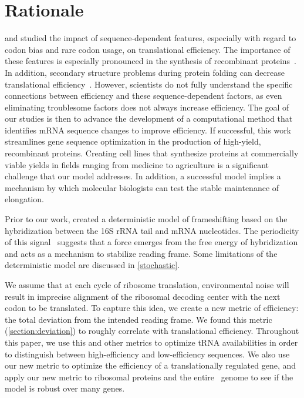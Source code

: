 \documentclass[12pt]{article}
\begin{document}
\section{Rationale}
\citet{kozak05} and \citet{kane95} studied the impact
of sequence-dependent features, especially with regard to codon bias 
and rare codon usage, on translational efficiency.  The importance of 
these features is especially pronounced in the synthesis of recombinant 
proteins~\cite{sorensen05}.  In addition, secondary structure problems 
during protein folding can decrease translational 
efficiency~\cite{kozak05}.  However, scientists do not fully
understand the specific connections between efficiency and these
sequence-dependent factors, as even eliminating troublesome factors
does not always increase efficiency. The goal of our studies is then to
advance the development of a computational method that identifies mRNA
sequence changes to improve efficiency. If
successful, this work streamlines gene sequence optimization in the
production of high-yield, recombinant proteins. Creating cell lines
that synthesize proteins at commercially viable yields in fields ranging from
medicine to agriculture is a significant challenge that our model
addresses. In addition, a successful model implies a mechanism by
which molecular biologists can test the stable maintenance of
elongation.

Prior to our work, \citet{lalit:jbsb} created a deterministic model of
frameshifting based on the hybridization between the 16S rRNA tail and
mRNA nucleotides.  The periodicity of this
signal~\cite{lalit:jbsb} suggests that a force emerges from the free
energy of hybridization and acts as a mechanism to
stabilize reading frame.  Some limitations of the deterministic 
model are discussed in \autoref{stochastic}.

We assume that at each cycle of ribosome translation, environmental
noise will result in imprecise alignment of the ribosomal decoding
center with the next codon to be translated.  To capture this idea, we
create a new metric of efficiency: the total deviation from the
intended reading frame.  We found this metric
(\autoref{section:deviation}) to roughly correlate with translational
efficiency.  Throughout this paper, we use this and other metrics to
optimize tRNA availabilities in order to distinguish between
high-efficiency and low-efficiency sequences. We also use our new
metric to optimize the efficiency of a translationally regulated gene,
and apply our new metric to ribosomal proteins and the entire
\ecoli\ genome to see if the model is robust over many genes.
\end{document}
